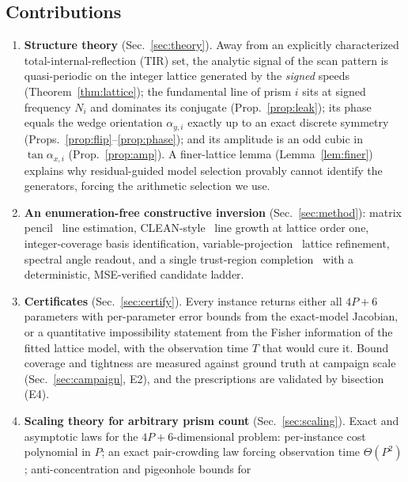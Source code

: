 \documentclass[twocolumn,preprintnumbers,amsmath,amssymb,pra,floatfix]{revtex4-2}
\begin{document}
\subsection{Contributions}

\begin{enumerate}
\item \textbf{Structure theory} (Sec.~\ref{sec:theory}).  Away from an
      explicitly characterized total-internal-reflection (TIR) set, the
      analytic signal of the scan pattern is quasi-periodic on the
      integer lattice generated by the \emph{signed} speeds
      (Theorem~\ref{thm:lattice}); the fundamental line of prism $i$
      sits at signed frequency $N_i$ and dominates its conjugate
      (Prop.~\ref{prop:leak}); its phase equals the wedge orientation
      $\alpha_{y,i}$ exactly up to an exact discrete symmetry
      (Props.~\ref{prop:flip}--\ref{prop:phase}); and its amplitude is
      an odd cubic in $\tan\alpha_{x,i}$ (Prop.~\ref{prop:amp}).  A
      finer-lattice lemma (Lemma~\ref{lem:finer}) explains why
      residual-guided model selection provably cannot identify the
      generators, forcing the arithmetic selection we use.
\item \textbf{An enumeration-free constructive inversion}
      (Sec.~\ref{sec:method}): matrix pencil~\cite{HuaSarkar1990,
      RoyKailath1989} line estimation, CLEAN-style~\cite{Hogbom1974}
      line growth at lattice order one, integer-coverage basis
      identification, variable-projection~\cite{GolubPereyra1973}
      lattice refinement, spectral angle readout, and a single
      trust-region completion~\cite{Branch1999} with a deterministic,
      MSE-verified candidate ladder.
\item \textbf{Certificates} (Sec.~\ref{sec:certify}).  Every instance
      returns either all $4P+6$ parameters with per-parameter error
      bounds from the exact-model Jacobian, or a quantitative
      impossibility statement from the Fisher information of the fitted
      lattice model, with the observation time $T$ that would cure it.
      Bound coverage and tightness are measured against ground truth at
      campaign scale (Sec.~\ref{sec:campaign}, E2), and the
      prescriptions are validated by bisection (E4).
\item \textbf{Scaling theory for arbitrary prism count}
      (Sec.~\ref{sec:scaling}).  Exact and asymptotic laws for the
      $4P+6$-dimensional problem: per-instance cost polynomial in $P$;
      an exact pair-crowding law forcing observation time
      $\Theta(P^{2})$; anti-concentration and pigeonhole bounds for

\end{enumerate}
\end{document}
